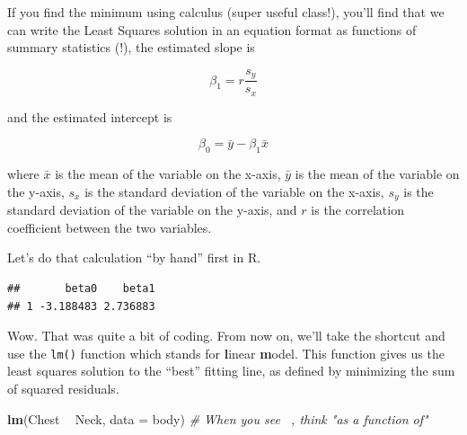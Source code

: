 \documentclass[]{book}
\newenvironment{Shaded}{\begin{snugshade}}{\end{snugshade}}
\newcommand{\CommentTok}[1]{\textcolor[rgb]{0.56,0.35,0.01}{\textit{#1}}}
\newcommand{\DataTypeTok}[1]{\textcolor[rgb]{0.13,0.29,0.53}{#1}}
\newcommand{\KeywordTok}[1]{\textcolor[rgb]{0.13,0.29,0.53}{\textbf{#1}}}
\newcommand{\NormalTok}[1]{#1}
\newcommand{\OperatorTok}[1]{\textcolor[rgb]{0.81,0.36,0.00}{\textbf{#1}}}
\newcommand{\StringTok}[1]{\textcolor[rgb]{0.31,0.60,0.02}{#1}}
\begin{document}
If you find the minimum using calculus (super useful class!), you'll find that we can write the Least Squares solution in an equation format as functions of summary statistics (!), the estimated slope is

\[ \beta_1  = r\frac{s_y}{s_x}\]

and the estimated intercept is

\[ \beta_0 = \bar{y} - \beta_1\bar{x} \]

where \(\bar{x}\) is the mean of the variable on the x-axis, \(\bar{y}\) is the mean of the variable on the y-axis, \(s_x\) is the standard deviation of the variable on the x-axis, \(s_y\) is the standard deviation of the variable on the y-axis, and \(r\) is the correlation coefficient between the two variables.

Let's do that calculation ``by hand'' first in R.

\begin{Shaded}
\end{Shaded}

\begin{verbatim}
##       beta0    beta1
## 1 -3.188483 2.736883
\end{verbatim}

Wow. That was quite a bit of coding. From now on, we'll take the shortcut and use the \texttt{lm()} function which stands for \textbf{l}inear \textbf{m}odel. This function gives us the least squares solution to the ``best'' fitting line, as defined by minimizing the sum of squared residuals.

\begin{Shaded}
\begin{Highlighting}[]
\KeywordTok{lm}\NormalTok{(Chest }\OperatorTok{~}\StringTok{ }\NormalTok{Neck, }\DataTypeTok{data =}\NormalTok{ body) }\CommentTok{# When you see ~, think "as a function of"}
\end{Highlighting}
\end{Shaded}
\end{document}
